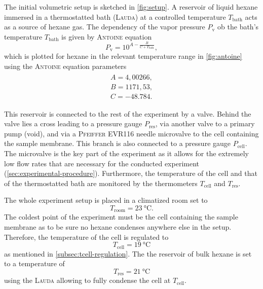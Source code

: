 \documentclass[../thesis.tex]{subfiles}
\begin{document}
        The initial volumetric setup is sketched in \cref{fig:setup}. A reservoir of liquid hexane immersed in a thermostatted bath (\textsc{Lauda}) at a controlled temperature $T_\mathrm{bath}$ acts as a source of hexane gas. The dependency of the vapor pressure $P_\mathrm{v}$ ob the bath's temperature $T_\mathrm{bath}$ is given by \textsc{Antoine} equation
        \begin{equation}
          P_\mathrm{v}=10^{A- \frac{B}{C+T_\mathrm{bath}}},
          \label{eq:antoine-equation}
        \end{equation}
        which is plotted for hexane in the relevant temperature range in \cref{fig:antoine} using the \textsc{Antoine} equation parameters
        \begin{align}
          \begin{split}
              A=4,00266,	\\
              B=1171,53,  \\
              C=-48.784.
          \end{split}
          \label{eq:antoine-parameters} %
        \end{align}

        

        This reservoir is connected to the rest of the experiment by a valve. Behind the valve lies a cross leading to a pressure gauge $P_\mathrm{res}$, via another valve to a primary pump (void), and via a \textsc{Pfeiffer} EVR116 needle microvalve to the cell containing the sample membrane. This branch is also connected to a pressure gauge $P_\mathrm{cell}$. The microvalve is the key part of the experiment as it allows for the extremely low flow rates that are necessary for the conducted experiment (\cref{sec:experimental-procedure}). Furthermore, the temperature of the cell and that of the thermostatted bath are monitored by the thermometers $T_\mathrm{cell}$ and $T_\mathrm{res}$.
        \medskip

        

        The whole experiment setup is placed in a climatized room set to \begin{equation}
            T_\mathrm{room} = \SI{23}{\celsius}.
        \end{equation}
        The coldest point of the experiment must be the cell containing the sample membrane as to be sure no hexane condenses anywhere else in the setup. Therefore, the temperature of the cell is regulated to
        \begin{equation}
            T_\mathrm{cell} = \SI{19}{\celsius}
        \end{equation}
        as mentioned in \cref{subsec:tcell-regulation}. The the reservoir of bulk hexane is set to a temperature of
        \begin{equation}
            T_\mathrm{res} = \SI{21}{\celsius}
        \end{equation}
        using the \textsc{Lauda} allowing to fully condense the cell at $T_\mathrm{cell}$.
\end{document}
